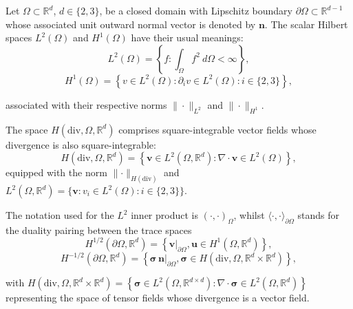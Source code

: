 \documentclass[english,11pt,3p,number,sort&compress]{elsarticle}
\begin{document}
Let $\Omega \subset \mathbb{R}^d$, $d \in \{2, 3\}$, be a closed domain with Lipschitz boundary $\partial \Omega \subset \mathbb{R}^{d-1}$ whose  associated unit outward normal vector is denoted by $\bm{n}$. The scalar Hilbert spaces $L^2(\Omega)$ and $H^1(\Omega)$ have their usual meanings:
\begin{equation*}
    L^2(\Omega) = \left\{f: \int_{\Omega} f^2  ~d \Omega < \infty \right\},
\end{equation*}
\begin{equation*}
    H^1(\Omega) = \left\{v \in L^2(\Omega) : \partial_i v \in L^2 
    (\Omega) : i \in\{2,3\} \right\},
\end{equation*}

\noindent associated with their respective norms $\| \cdot \|_{L^2}$ and $\| \cdot \|_{H^1}$.

The space $H(\text{div},\Omega,\mathbb{R}^d)$ comprises square-integrable vector fields whose divergence is also square-integrable:
\begin{equation*}
	H(\text{div},\Omega,\mathbb{R}^d) = \left\{\bm{v} \in L^2(\Omega,\mathbb{R}^d) : \nabla \cdot \bm{v} \in L^2(\Omega) \right\},
\end{equation*}
\noindent equipped with the norm $\lVert \cdot \rVert_{H(\text{div})}$ and \(L^2(\Omega,\mathbb{R}^d)=\{\bm{v} : v_i \in L^2(\Omega) : i \in\{2,3\} \}\). 

The notation used for the $L^2$ inner product is $(\cdot,\cdot)_{\Omega}$, whilst $\langle \cdot,\cdot\rangle_{\partial\Omega}$ stands for the duality pairing between the trace spaces
\begin{equation*}
	H^{1/2}(\partial\Omega,\mathbb{R}^d) = \left\{\bm{v} \lvert_{\partial\Omega}, \bm{u} \in H^1(\Omega,\mathbb{R}^d)\right\},
\end{equation*}
\begin{equation*}
	H^{-1/2}(\partial\Omega,\mathbb{R}^d) = \left\{\bm{\sigma} \,\bm{n} \lvert_{\partial\Omega}, \bm{\sigma} \in H(\text{div},\Omega,\mathbb{R}^d \times \mathbb{R}^d) \right\},
\end{equation*}

\noindent with $H(\text{div},\Omega,\mathbb{R}^d \times \mathbb{R}^d) = \left\{\bm{\sigma} \in L^2(\Omega,\mathbb{R}^{d \times d}) : \nabla \cdot \bm{\sigma} \in L^2(\Omega,\mathbb{R}^d) \right\}$ representing the space of tensor fields whose divergence is a vector field.
\end{document}
